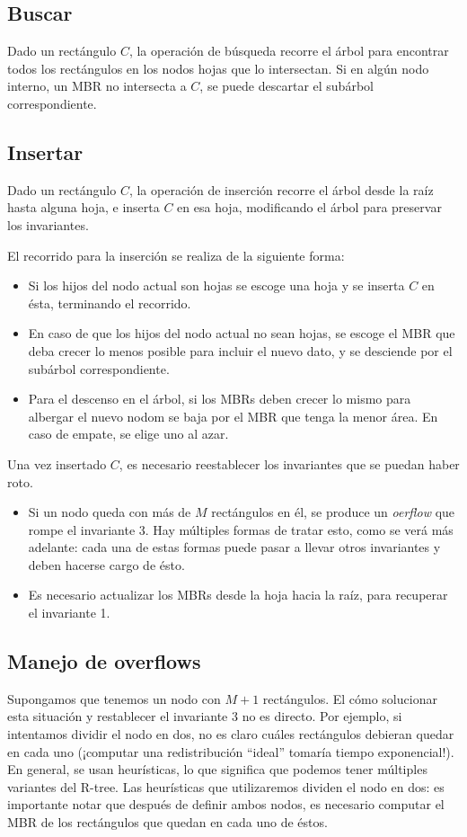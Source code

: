 \documentclass[dcc,uchile]{fcfmcourse}
\begin{document}
\subsection{Buscar}
Dado un rectángulo $C$, la operación de búsqueda recorre el árbol para encontrar todos los rectángulos en los nodos hojas que lo intersectan. Si en algún nodo interno, un MBR no intersecta a $C$, se puede descartar el subárbol correspondiente.
\subsection{Insertar}
Dado un rectángulo $C$, la operación de inserción recorre el árbol desde la raíz hasta alguna hoja, e inserta $C$ en esa hoja, modificando el árbol para preservar los invariantes.

El recorrido para la inserción se realiza de la siguiente forma:
\begin{itemize}
    \item Si los hijos del nodo actual son hojas se escoge una hoja y se inserta $C$ en ésta, terminando el recorrido.
    \item En caso de que los hijos del nodo actual no sean hojas, se escoge el MBR que deba crecer lo menos posible para incluir el nuevo dato, y se desciende por el subárbol correspondiente.
    \item Para el descenso en el árbol, si los MBRs deben crecer lo mismo para albergar el nuevo nodom se baja por el MBR que tenga la menor área. En caso de empate, se elige uno al azar.
\end{itemize}
Una vez insertado $C$, es necesario reestablecer los invariantes que se puedan haber roto.
\begin{itemize}
    \item Si un nodo queda con más de $M$ rectángulos en él, se produce un \textit{oerflow} que rompe el invariante 3. Hay múltiples formas de tratar esto, como se verá más adelante: cada una de estas formas puede pasar a llevar otros invariantes y deben hacerse cargo de ésto.
    \item Es necesario actualizar los MBRs desde la hoja hacia la raíz, para recuperar el invariante 1.
\end{itemize}
\subsection{Manejo de overflows}
Supongamos que tenemos un nodo con $M+1$ rectángulos. El cómo solucionar esta situación y restablecer el invariante 3 no es directo. Por ejemplo, si intentamos dividir el nodo en dos, no es claro cuáles rectángulos debieran quedar en cada uno (¡computar una redistribución ``ideal'' tomaría tiempo exponencial!). En general, se usan heurísticas, lo que significa que podemos tener múltiples variantes del R-tree. Las heurísticas que utilizaremos dividen el nodo en dos: es importante notar que después de definir ambos nodos, es necesario computar el MBR de los rectángulos que quedan en cada uno de éstos.
\end{document}

